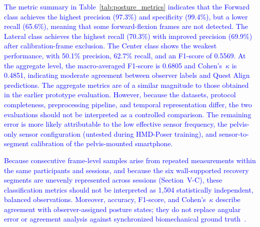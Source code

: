 \documentclass[conference]{IEEEtran}
\newcommand{\CC}[1]{\textcolor{blue}{#1}}
\begin{document}
\begin{table}[t]
\caption{\CC{One-vs-rest counts and classification metrics for the controlled posture-orientation test ($N=1{,}504$)}}
\label{tab:posture_metrics}
\centering
\scriptsize
\renewcommand{\arraystretch}{1.15}
\end{table}

\CC{The metric summary in Table~\ref{tab:posture_metrics} indicates that the Forward class achieves the highest precision (97.3\%) and specificity (99.4\%), but a lower recall (65.6\%), meaning that some forward-flexion frames are not detected. The Lateral class achieves the highest recall (70.3\%) with improved precision (69.9\%) after calibration-frame exclusion. The Center class shows the weakest performance, with 50.1\% precision, 62.7\% recall, and an F1-score of 0.5569. At the aggregate level, the macro-averaged F1-score is 0.6805 and Cohen's~$\kappa$ is 0.4851, indicating moderate agreement between observer labels and Quest Align predictions. The aggregate metrics are of a similar magnitude to those obtained in the earlier prototype evaluation. However, because the datasets, protocol completeness, preprocessing pipeline, and temporal representation differ, the two evaluations should not be interpreted as a controlled comparison. The remaining error is more likely attributable to the low effective sensor frequency, the pelvis-only sensor configuration (untested during HMD-Poser training), and sensor-to-segment calibration of the pelvis-mounted smartphone.}

\CC{Because consecutive frame-level samples arise from repeated measurements within the
same participants and sessions, and because the six wall-supported recovery segments are
unevenly represented across sessions (Section~V-C), these classification metrics should not
be interpreted as 1,504 statistically independent, balanced observations. Moreover,
accuracy, F1-score, and Cohen's~$\kappa$ describe agreement with observer-assigned posture
states; they do not replace angular error or agreement analysis against synchronized
biomechanical ground truth~\cite{ali_trunk_validation,villa_imu_validation}.}
\end{document}
